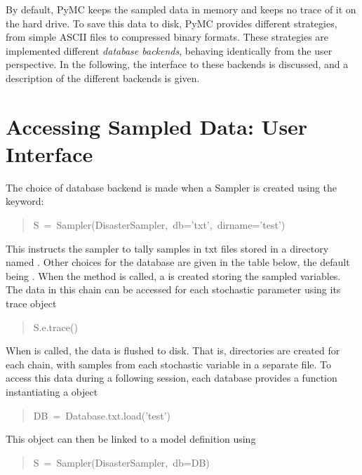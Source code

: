 

By default, PyMC keeps the sampled data in memory and keeps no trace of it on the hard drive. To save this data to disk, PyMC provides different strategies, from simple ASCII files to compressed binary formats. These strategies are implemented different \emph{database backends}, behaving identically from the user perspective. In the following, the interface to these backends is discussed, and a description of the different backends is given.



\hypertarget{accessing-sampled-data-user-interface}{}
\section*{Accessing Sampled Data: User Interface}
\label{accessing-sampled-data-user-interface}

The choice of database backend is made when a Sampler is created using the  keyword:
\begin{quote}{\ttfamily \raggedright \noindent
S~=~Sampler(DisasterSampler,~db='txt',~dirname='test')
}\end{quote}

This instructs the sampler to tally samples in txt files stored in a directory named . Other choices for the database are given in the table below, the default being . When the  method is called, a  is created storing the sampled variables. The data in this chain can be accessed for each stochastic parameter using its trace object
\begin{quote}{\ttfamily \raggedright \noindent
S.e.trace()
}\end{quote}

When  is called, the data is flushed to disk. That is, directories are created for each chain, with samples from each stochastic variable in a separate file. To access this data during a following session, each database provides a  function instantiating a  object
\begin{quote}{\ttfamily \raggedright \noindent
DB~=~Database.txt.load('test')
}\end{quote}

This object can then be linked to a model definition using
\begin{quote}{\ttfamily \raggedright \noindent
S~=~Sampler(DisasterSampler,~db=DB)
}\end{quote}

